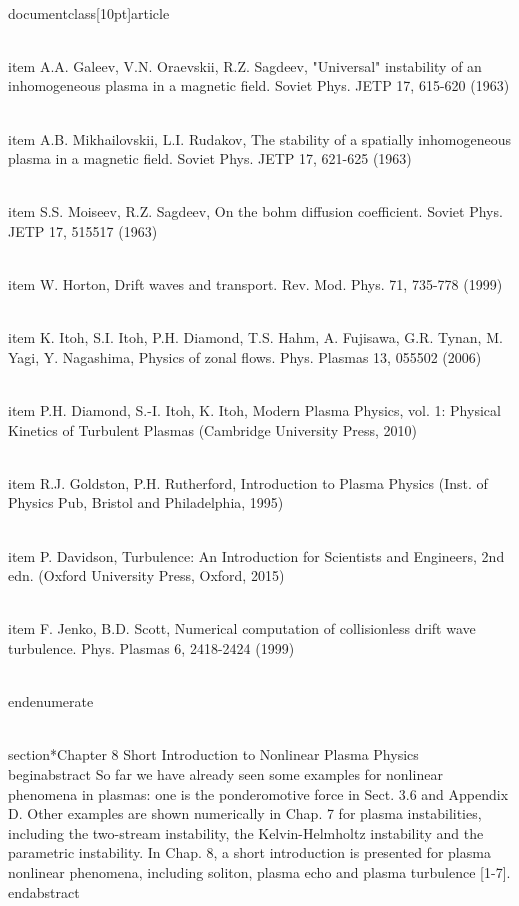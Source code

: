\\documentclass[10pt]{article}
\begin{document}
{{{{  \\item A.A. Galeev, V.N. Oraevskii, R.Z. Sagdeev, "Universal" instability of an inhomogeneous plasma in a magnetic field. Soviet Phys. JETP 17, 615-620 (1963)

  \\item A.B. Mikhailovskii, L.I. Rudakov, The stability of a spatially inhomogeneous plasma in a magnetic field. Soviet Phys. JETP 17, 621-625 (1963)

  \\item S.S. Moiseev, R.Z. Sagdeev, On the bohm diffusion coefficient. Soviet Phys. JETP 17, 515517 (1963)

  \\item W. Horton, Drift waves and transport. Rev. Mod. Phys. 71, 735-778 (1999)

  \\item K. Itoh, S.I. Itoh, P.H. Diamond, T.S. Hahm, A. Fujisawa, G.R. Tynan, M. Yagi, Y. Nagashima, Physics of zonal flows. Phys. Plasmas 13, 055502 (2006)

  \\item P.H. Diamond, S.-I. Itoh, K. Itoh, Modern Plasma Physics, vol. 1: Physical Kinetics of Turbulent Plasmas (Cambridge University Press, 2010)

  \\item R.J. Goldston, P.H. Rutherford, Introduction to Plasma Physics (Inst. of Physics Pub, Bristol and Philadelphia, 1995)

  \\item P. Davidson, Turbulence: An Introduction for Scientists and Engineers, 2nd edn. (Oxford University Press, Oxford, 2015)

  \\item F. Jenko, B.D. Scott, Numerical computation of collisionless drift wave turbulence. Phys. Plasmas 6, 2418-2424 (1999)

\\end{enumerate}

\\section*{Chapter 8 Short Introduction to Nonlinear Plasma Physics }
\\begin{abstract}
So far we have already seen some examples for nonlinear phenomena in plasmas: one is the ponderomotive force in Sect. 3.6 and Appendix D. Other examples are shown numerically in Chap. 7 for plasma instabilities, including the two-stream instability, the Kelvin-Helmholtz instability and the parametric instability. In Chap. 8, a short introduction is presented for plasma nonlinear phenomena, including soliton, plasma echo and plasma turbulence [1-7].
\\end{abstract}

}}}}
\end{document}

